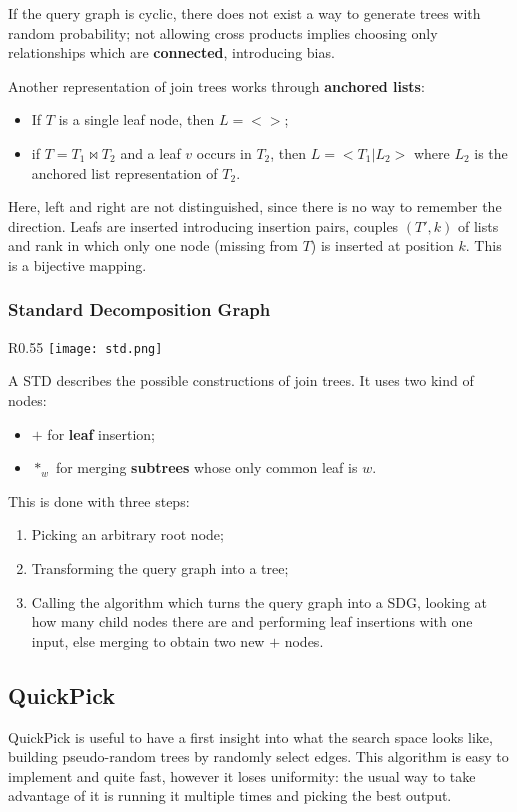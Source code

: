 If the query graph is cyclic, there does not exist a way to generate trees with random probability; not allowing cross products implies choosing only relationships which are \textbf{connected}, introducing bias. 

Another representation of join trees works through \textbf{anchored lists}:
\begin{itemize}
	\item If $T$ is a single leaf node, then $L = <>$;
	\item if $T = T_1 \bowtie T_2$ and a leaf $v$ occurs in $T_2$, then $L = <T_1 | L_2>$ where $L_2$ is the anchored list representation of $T_2$.
\end{itemize}
Here, left and right are not distinguished, since there is no way to remember the direction. Leafs are inserted introducing insertion pairs, couples $(T', k)$ of lists and rank in which only one node (missing from $T$) is inserted at position $k$. This is a bijective mapping.

\newpage
\subsubsection{Standard Decomposition Graph}
\begin{wrapfigure}{R}{0.55\textwidth}
	\vspace{-5pt}
	\texttt{[image: std.png]}
	\vspace{-70pt}
\end{wrapfigure}
A STD describes the possible constructions of join trees. It uses two kind of nodes:
\begin{itemize}
	\item $+$ for \textbf{leaf} insertion;
	\item $*_w$ for merging \textbf{subtrees} whose only common leaf is $w$.
\end{itemize}
This is done with three steps:
\begin{enumerate}
	\item Picking an arbitrary root node;
	\item Transforming the query graph into a tree;
	\item Calling the algorithm which turns the query graph into a SDG, looking at how many child nodes there are and performing leaf insertions with one input, else merging to obtain two new $+$ nodes.
\end{enumerate}

\subsection{QuickPick}
QuickPick is useful to have a first insight into what the search space looks like, building pseudo-random trees by randomly select edges. This algorithm is easy to implement and quite fast, however it loses uniformity: the usual way to take advantage of it is running it multiple times and picking the best output.

